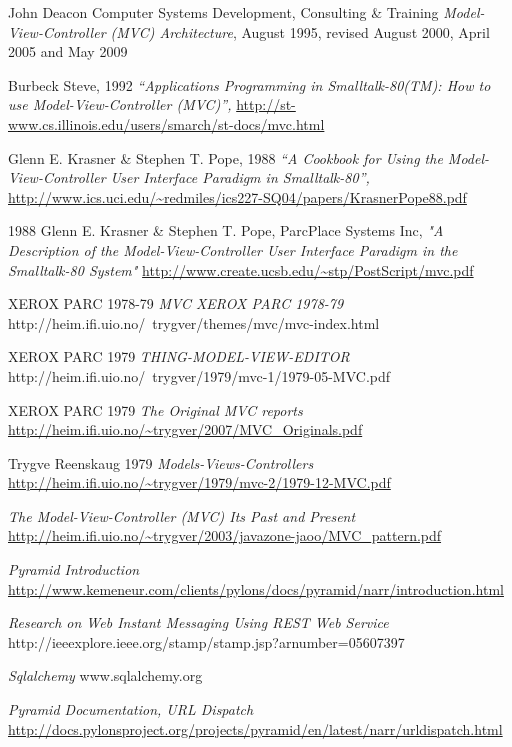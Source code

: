 \documentclass[finnish,utf8,nonumbib,palatino,kandi]{gradu2}
\begin{document}
\begin{thebibliography}{13} %
    John Deacon Computer Systems Development, Consulting \& Training
    \emph{Model-View-Controller (MVC) Architecture},
    August 1995, revised August 2000, April 2005 and May 2009

   Burbeck Steve, 1992
  \emph{“Applications Programming in Smalltalk-80(TM): How to use Model-View-Controller (MVC)”,}
  \url{http://st-www.cs.illinois.edu/users/smarch/st-docs/mvc.html}

   Glenn E. Krasner \& Stephen T. Pope, 1988
  \emph{“A Cookbook for Using the Model-View-Controller User Interface Paradigm in Smalltalk-80”,}
  \url{http://www.ics.uci.edu/~redmiles/ics227-SQ04/papers/KrasnerPope88.pdf}

 1988 Glenn E. Krasner \& Stephen T. Pope, ParcPlace Systems Inc,
	\emph{"A Description of the Model-View-Controller User Interface Paradigm in the Smalltalk-80 System"}
	\url{http://www.create.ucsb.edu/~stp/PostScript/mvc.pdf}

  XEROX PARC 1978-79
  \emph{MVC XEROX PARC 1978-79}
http://heim.ifi.uio.no/~trygver/themes/mvc/mvc-index.html

  XEROX PARC 1979
  \emph{THING-MODEL-VIEW-EDITOR}
   http://heim.ifi.uio.no/~trygver/1979/mvc-1/1979-05-MVC.pdf

  XEROX PARC 1979
  \emph{The Original MVC reports}
 \url{http://heim.ifi.uio.no/~trygver/2007/MVC_Originals.pdf}

  Trygve Reenskaug 1979
  \emph{Models-Views-Controllers}
 \url{http://heim.ifi.uio.no/~trygver/1979/mvc-2/1979-12-MVC.pdf}

 \emph{The Model-View-Controller (MVC) Its Past and Present}
\url{http://heim.ifi.uio.no/~trygver/2003/javazone-jaoo/MVC_pattern.pdf}

  \emph{Pyramid Introduction}
   \url{http://www.kemeneur.com/clients/pylons/docs/pyramid/narr/introduction.html}

\emph{Research on Web Instant Messaging Using REST Web Service}
http://ieeexplore.ieee.org/stamp/stamp.jsp?arnumber=05607397

\emph{Sqlalchemy}
www.sqlalchemy.org

\emph{Pyramid Documentation, URL Dispatch}
\url{http://docs.pylonsproject.org/projects/pyramid/en/latest/narr/urldispatch.html}


\end{thebibliography}
\end{document}
